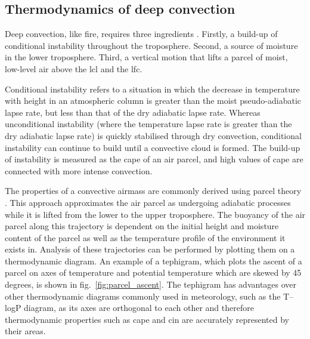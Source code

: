 \subsection{Thermodynamics of deep convection}

Deep convection, like fire, requires three ingredients \citep{brooks_century_2019}. 
Firstly, a build-up of conditional instability throughout the troposphere. 
Second, a source of moisture in the lower troposphere. 
Third, a vertical motion that lifts a parcel of moist, low-level air above the \acrfull{lcl} and the \acrfull{lfc}.

Conditional instability refers to a situation in which the decrease in temperature with height in an atmospheric column is greater than the moist pseudo-adiabatic lapse rate, but less than that of the dry adiabatic lapse rate. 
Whereas unconditional instability (where the temperature lapse rate is greater than the dry adiabatic lapse rate) is quickly stabilised through dry convection, conditional instability can continue to build until a convective cloud is formed. 
The build-up of instability is measured as the \acrfull{cape} of an air parcel, and high values of \acrshort{cape} are connected with more intense convection.

The properties of a convective airmass are commonly derived using parcel theory \citep{stull_practical_2016}. 
This approach approximates the air parcel as undergoing adiabatic processes while it is lifted from the lower to the upper troposphere. 
The buoyancy of the air parcel along this trajectory is dependent on the initial height and moisture content of the parcel as well as the temperature profile of the environment it exists in. 
Analysis of these trajectories can be performed by plotting them on a thermodynamic diagram. 
An example of a tephigram, which plots the ascent of a parcel on axes of temperature and potential temperature which are skewed by 45 degrees, is shown in fig.~\ref{fig:parcel_ascent}.
The tephigram has advantages over other thermodynamic diagrams commonly used in meteorology, such as the T--logP diagram, as its axes are orthogonal to each other and therefore thermodynamic properties such as \acrshort{cape} and \acrshort{cin} are accurately represented by their areas.

